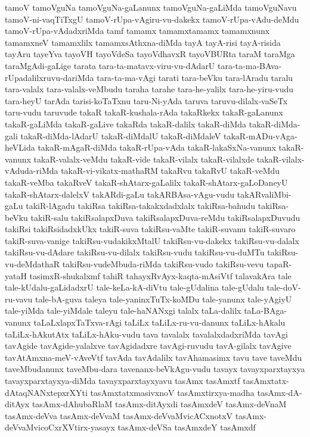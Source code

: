{tamoV
tamoVguNa
tamoVguNa-gaLanunx
tamoVguNa-gaLiMda
tamoVguNavu
tamoV-ni-vaqTiTxgU
tamoV-rUpa-vAgiru-vu-dakekx
tamoV-rUpa-vAdu-deMdu
tamoV-rUpa-vAdadxriMda
tamf
tamamx
tamamxtamamx
tamamxnunx
tamamxneV
tamamxlilx
tamamxsAthxna-diMda
tayA
tayA-risi
tayA-risida
tayAru
tayeYva
tayoVH
tayoVdeSa
tayoVdhavxR
tayoVBURta
taraM
taraMga
taraMgAdi-gaLige
tarata
tara-ta-matavx-viru-vu-dAdarU
tara-ta-ma-BAva-rUpadalilxruvu-dariMda
tara-ta-ma-vAgi
tarati
tara-beVku
tara-lAradu
taralu
tara-valalx
tara-valalx-veMbudu
taraha
tarahe
tara-he-yalilx
tara-he-yiru-vudu
tara-heyU
tarAda
tarisi-koTaTxnu
taru-Ni-yAda
taruva
taruvu-dilalx-vaSeTx
taru-vudu
taruvude
takaR
takaR-kushala-rAda
takaRkekx
takaR-gaLanunx
takaR-gaLiMda
takaR-gaLive
takaRda
takaR-dalilx
takaR-diMda
takaR-diMda-gali
takaR-diMda-lAdarU
takaR-diMdalU
takaR-diMdaleV
takaR-mADu-vAga-heVLida
takaR-mAgaR-diMda
takaR-rUpa-vAda
takaR-lakaSxNa-vanunx
takaR-vanunx
takaR-valalx-veMdu
takaR-vide
takaR-vilalx
takaR-vilalxde
takaR-vilalx-vAduda-riMda
takaR-vi-vikatx-mathaRM
takaRvu
takaRvU
takaR-veMdu
takaR-veMba
takaRveV
takaR-shAtarx-gaLalilx
takaR-shAtarx-gaLoDaneyU
takaR-shAtarx-dalelxV
takARdi-gaLu
takARBAsa-vAgu-vudu
takARvaliMbi-gaLu
takiR-lAgadu
takiRsa
takiRsa-takakxdadxlalx
takiRsa-bahudu
takiRsa-beVku
takiR-salu
takiRsalapxDuva
takiRsalapxDuva-reMdu
takiRsalapxDuvudu
takiRsi
takiRsidadxkUkx
takiR-suva
takiRsu-vaMte
takiR-suvanu
takiR-suvaro
takiR-suva-vanige
takiRsu-vudakikxMtalU
takiRsu-vu-dakekx
takiRsu-vu-dalalx
takiRsu-vu-dAdare
takiRsu-vu-dilalx
takiRsu-vudu
takiRsu-vu-duMTu
takiRsu-vu-deMdathaR
takiRsu-vudeMbuda-riMda
takiRsu-vudo
takiRsu-vevu
tapaR-yataH
tasimxR-shukalxmf
tahiR
tahayxRvAyx-kaqta-mAsiVtf
talavakAra
tale
tale-kUdalu-gaLidadxrU
tale-keLa-kA-diVtu
tale-gUdalina
tale-gUdalu
tale-doV-ru-vavu
tale-bA-guva
taleya
tale-yaninxTuTx-koMDu
tale-yanunx
tale-yAgiyU
tale-yiMda
tale-yiMdale
taleyu
tale-haNANxgi
talalx
taLa-dalilx
taLa-BAga-vanunx
taLaLxlapxTaTxva-rAgi
taLiLx
taLiLx-ru-vu-danunx
taLiLx-hAkalu
taLiLx-hAkutAtx
taLiLx-hAku-vudu
tava
tavalalx
tavalalxdadxriMda
tavAgi
tavAgide
tavAgide-yalalxve
tavAgidadxre
tavAgi-ruvudu
tavA-gilalx
tavAgive
tavAtAmxna-meV-vAveVtf
tavAda
tavAdalilx
tavAhamasimx
tavu
tave
taveMdu
taveMbudanunx
taveMbu-dara
tavenanx-beVkAgu-vudu
tavayx
tavayxparxtayxya
tavayxparxtayxya-diMda
tavayxparxtayxyavu
tasAmx
tasAmxtf
tasAmxtatx-dAtaqNANxtepxrXYti
tasAmxtatxmasivxnoV
tasAmxtirxya-madha
tasAmx-dA-ditAyx
tasAmx-dAhubaRlaM
tasAmx-ditAyxdi
tasAmxdeV
tasAmx-deVnaM
tasAmx-deVva
tasAmx-deVvaM
tasAmx-deVvaMvicACxnotxV
tasAmx-deVvaMvicoCxrXVtirx-yasayx
tasAmx-deVSa
tasAmxdeY
tasAmxdf
}

